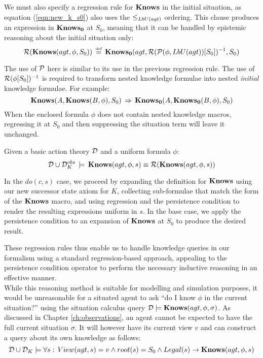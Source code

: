 We must also specify a regression rule for $\mathbf{Knows}$ in the initial
situation, as equation (\ref{eqn:new_k_s0}) also uses the $\leq_{LbU(agt)}$
ordering. This clause produces an expression in $\mathbf{Knows_{0}}$ at $S_{0}$,
meaning that it can be handled by epistemic reasoning about the initial
situation only:\begin{equation}
\mathcal{R}(\mathbf{Knows}(agt,\phi,S_{0}))\,\stackrel{\mbox{\tiny def}}{=}\,\mathbf{Knows_{0}}(agt,\mathcal{R}(\mathcal{P}(\phi,LbU(agt))[S_{0}])^{-1},S_{0})\label{eqn:R_s0}\end{equation}


The use of $\mathcal{P}$ here is similar to its use in the previous regression
rule. The use of $\mathcal{R}(\phi[S_{0}])^{-1}$ is required to transform
nested knowledge formulae into nested \emph{initial} knowledge formulae.
For example:\[
\mathbf{Knows}(A,\mathbf{Knows}(B,\phi),S_{0})\,\Rightarrow\,\mathbf{Knows_{0}}(A,\mathbf{Knows_{0}}(B,\phi),S_{0})\]
 When the enclosed formula $\phi$ does not contain nested knowledge
macros, regressing it at $S_{0}$ and then suppressing the situation
term will leave it unchanged. 
\begin{thm}
\label{thm:Reg_Knows}Given a basic action theory $\mathcal{D}$ and a uniform
formula $\phi$:\[
\mathcal{D}\cup\mathcal{D}_{K}^{obs}\,\models\,\mathbf{Knows}(agt,\phi,s)\equiv\mathcal{R}(\mathbf{Knows}(agt,\phi,s))\]
 \end{thm}
\begin{proofsketch}
In the $do(c,s)$ case, we proceed by expanding the definition for
$\mathbf{Knows}$ using our new successor state axiom for $K$, collecting
sub-formulae that match the form of the $\mathbf{Knows}$ macro, and using
regression and the persistence condition to render the resulting expressions
uniform in $s$. In the base case, we apply the persistence condition
to an expansion of $\mathbf{Knows}$ at $S_{0}$ to produce the desired result. 
\end{proofsketch}
These regression rules thus enable us to handle knowledge queries
in our formalism using a standard regression-based approach, appealing
to the persistence condition operator to perform the necessary inductive
reasoning in an effective manner.\\


While this reasoning method is suitable for modelling and simulation
purposes, it would be unreasonable for a situated agent to ask {}``do
I know $\phi$ in the current situation?'' using the situation calculus
query $\mathcal{D}\models\mathbf{Knows}(agt,\phi,\sigma)$. As discussed in
Chapter \ref{ch:observations}, an agent cannot be expected to have
the full current situation $\sigma$. It will however have its current
view $v$ and can construct a query about its own knowledge as follows:\[
\mathcal{D}\cup\mathcal{D}_{K}\models\forall s:\, View(agt,s)=v\wedge root(s)=S_{0}\wedge Legal(s)\rightarrow\mathbf{Knows}(agt,\phi,s)\]


